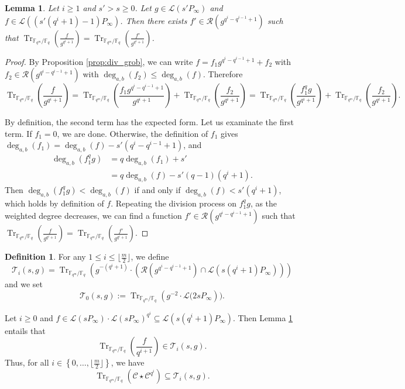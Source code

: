 \documentclass[a4paper]{article}
\newtheorem{lemma}[thm]{Lemma}
\theoremstyle{definition}
\newtheorem{definition}[thm]{Definition}
\theoremstyle{remark}
\newcommand{\calL}{\mathcal{L}}
\newcommand{\calC}{\mathcal{C}}
\newcommand{\calR}{\mathcal{R}}
\newcommand{\calT}{\mathcal{T}}
\newcommand{\fq}{\mathbb{F}_{q}}
\newcommand{\Tr}[1]{\operatorname{Tr}_{\mathbb{F}_{q^m}/\fq}\left(#1\right)}
\newcommand{\set}[1]{\left\{#1\right\}}
\newcommand{\degab}[1]{\deg_{a,b}\left(#1\right)}
\begin{document}
\begin{lemma} \label{lem:weighted_division}
	Let $i \geq 1$ and $s'>s \geq 0$. Let $g \in \calL\left(s'P_\infty\right)$ and $f \in \calL\left(\left(s'(q^i+1)-1\right)P_\infty\right)$. Then there exists $f' \in \calR\left(g^{q^i-q^{i-1}+1}\right)$ such that $\Tr{\frac{f}{g^{q^i+1}}} = \Tr{\frac{f'}{g^{q^i+1}}} $.
\end{lemma}

\begin{proof}

By Proposition \ref{prop:div_grob}, we can write $f=f_1 g^{q^i-q^{i-1}+1} +f_2$ with
	$f_2 \in \calR\left(g^{q^i-q^{i-1}+1}\right)$ with $\degab{f_2} \leq \degab{f}$. Therefore
	\[\Tr{\frac{f}{g^{q^i+1}}}=\Tr{\frac{f_1 g^{q^i-q^{i-1}+1}}{g^{q^i+1}}} +\Tr{\frac{f_2}{g^{q^i+1}}}= \Tr{\frac{f_1^qg}{g^{q^i+1}}} +\Tr{\frac{f_2}{g^{q^i+1}}}. \]
	
	By definition, the second term has the expected form. Let us examinate the first term. If $f_1=0$, we are done. Otherwise, the definition of $f_1$ gives
$\degab{f_1} =\degab{f} - s'(q^i-q^{i-1}+1)$, and
	\begin{align*}
	\degab{f_1^qg} 	&= q \degab{f_1} + s'\\
					&= q\degab{f} - s'(q-1)(q^i+1).
	\end{align*} 
Then  $\degab{f_1^qg} < \degab{f}$ if and only if $\degab{f} < s'(q^i+1)$, which holds by definition of $f$. Repeating the division process on $f_1^qg$, as the weighted degree decreases, we can find a function $f' \in \calR\left(g^{q^i-q^{i-1}+1}\right)$ such that $\Tr{\frac{f}{g^{q^i+1}}} = \Tr{\frac{f'}{g^{q^i+1}}} $.
\end{proof}

\begin{definition} \label{def:T_i's}
For any $1 \leq i \leq \lfloor\frac{m}{2}\rfloor$, we define
$$\calT_i(s,g)= \Tr{g^{-(q^i+1)}\cdot \left( \calR\left(g^{q^i-q^{i-1}+1}\right)  \cap \calL(s(q^i+1)P_\infty)\right)}$$
and we set $$\calT_0(s,g) := \Tr{g^{-2} \cdot \calL(2sP_\infty}).$$
\end{definition}


\noindent Let $i \geq 0$ and $f \in \calL(sP_\infty) \cdot \calL(sP_\infty)^{q^i} \subseteq \calL(s(q^i+1)P_\infty)$. Then 
Lemma \ref{lem:weighted_division} entails that 
$$\Tr{\dfrac{f}{q^{i+1}}} \in \calT_i(s,g).$$
Thus, for all $i \in \set{0,\dots,\lfloor \frac{m}{2} \rfloor}$, we have \begin{equation} \label{eq:Tr(C*C^q^i)_dans_T_i}
\Tr{\calC \star \calC^{q^i}} \subseteq \calT_i(s,g).
\end{equation}
\end{document}
